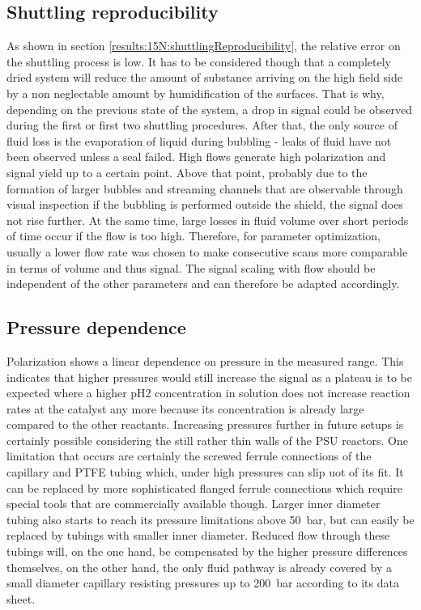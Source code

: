         \subsection{Shuttling reproducibility}
            As shown in section \ref{results:15N:shuttlingReproducibility}, the relative error on the shuttling process is low. It has to be considered though that a completely dried system will reduce the amount of substance arriving on the high field side by a non neglectable amount by humidification of the surfaces. That is why, depending on the previous state of the system, a drop in signal could be observed during the first or first two shuttling procedures. After that, the only source of fluid loss is the evaporation of liquid during bubbling - leaks of fluid have not been observed unless a seal failed. High flows generate high polarization  and signal yield up to a certain point. Above that point, probably due to the formation of larger bubbles and streaming channels that are observable through visual inspection if the bubbling is performed outside the shield, the signal does not rise further. At the same time, large losses in fluid volume over short periods of time occur if the flow is too high. Therefore, for parameter optimization, usually  a lower flow rate was chosen to make consecutive scans more comparable in terms of volume and thus signal. The signal scaling with flow should be independent of the other parameters and can therefore be adapted accordingly.
        \subsection{Pressure dependence}
            Polarization shows a linear dependence on pressure in the measured range. This indicates that higher pressures would still increase the signal as a plateau is to be expected where a higher pH2 concentration in solution does not increase reaction rates at the catalyst any more because its concentration is already large compared to the other reactants. Increasing pressures further in future setups is certainly possible considering the still rather thin walls of the PSU reactors. One limitation that occurs are certainly the screwed ferrule connections of the capillary and PTFE tubing which, under high pressures can slip uot of its fit. It can be replaced by more sophisticated flanged ferrule connections which require special tools that are commercially available though. Larger inner diameter tubing also starts to reach its pressure limitations above \SI{50}{\bar}, but can easily be replaced by tubings with smaller inner diameter. Reduced flow through these tubings will, on the one hand, be compensated by the higher pressure differences themselves, on the other hand, the only fluid pathway is already covered by a small diameter capillary resisting pressures up to \SI{200}{\bar} according to its data sheet.

